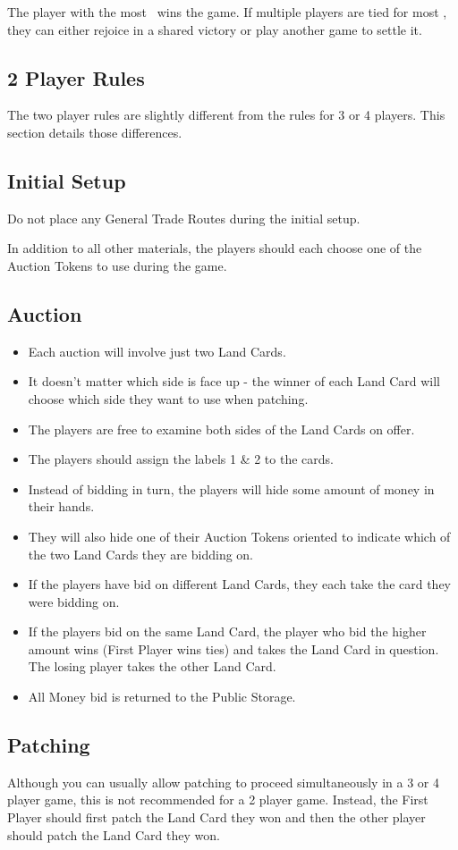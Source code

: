 \documentclass[10pt,twocolumn]{article}
\begin{document}
The player with the most \vps\ wins the game. If multiple players are tied for most \vp, they can either rejoice in a shared victory or play another game to settle it.
\begin{appendices}
\section{2 Player Rules}
The two player rules are slightly different from the rules for 3 or 4 players. This section details those differences.
\subsection{Initial Setup}
Do not place any General Trade Routes during the initial setup.

In addition to all other materials, the players should each choose one of the Auction Tokens to use during the game.
\subsection{Auction}
\begin{itemize}
\item Each auction will involve just two Land Cards.
\item It doesn't matter which side is face up - the winner of each Land Card will choose which side they want to use when patching.
\item The players are free to examine both sides of the Land Cards on offer.
\item The players should assign the labels 1 \& 2 to the cards.
\item Instead of bidding in turn, the players will hide some amount of money in their hands.
\item They will also hide one of their Auction Tokens oriented to indicate which of the two Land Cards they are bidding on.
\item If the players have bid on different Land Cards, they each take the card they were bidding on.
\item If the players bid on the same Land Card, the player who bid the higher amount wins (First Player wins ties) and takes the Land Card in question. The losing player takes the other Land Card.
\item All Money bid is returned to the Public Storage.
\end{itemize}
\subsection{Patching}
Although you can usually allow patching to proceed simultaneously in a 3 or 4 player game, this is not recommended for a 2 player game. Instead, the First Player should first patch the Land Card they won and then the other player should patch the Land Card they won.

\end{appendices}
\end{document}
